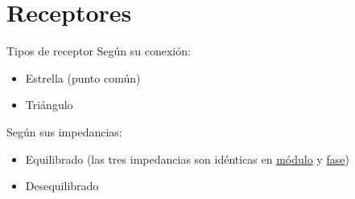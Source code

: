 \documentclass[aspectratio=169, usenames,svgnames,dvipsnames]{beamer}
\begin{document}


\section{Receptores}

\begin{frame}{Tipos de receptor}
    Según su \alert{conexión}:
    \vspace{1mm}
        \begin{itemize}
            \item \alert{Estrella} (punto común) 
            \vspace{2mm}
            \item \alert{Triángulo} 
        \end{itemize}

    \vspace{5mm}
    Según sus \alert{impedancias}:
    \vspace{1mm}
        \begin{itemize}
            \item \alert{Equilibrado} (las tres impedancias son idénticas en \underline{módulo} y \underline{fase})
            \vspace{2mm}
            \item \alert{Desequilibrado}
        \end{itemize}
\end{frame}

\end{document}
